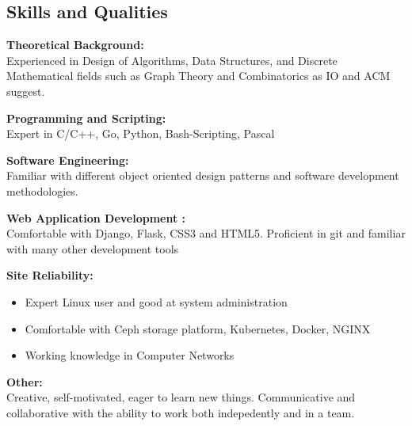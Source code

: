\documentclass[margin]{res}
\begin{document}
\begin{resume}
\section{Skills and Qualities} 
    {\bf Theoretical Background:}
    \\Experienced in Design of Algorithms, Data Structures, and Discrete Mathematical fields such as Graph Theory and Combinatorics as IO and ACM suggest.

	{\bf Programming and Scripting:}
	\\Expert in C/C++, Go, Python, Bash-Scripting, Pascal
	
    {\bf Software Engineering:}
    \\Familiar with different object oriented design patterns and software development methodologies.
	
	{\bf Web Application Development	:}
	\\Comfortable with Django, Flask, CSS3 and HTML5. Proficient in git and familiar with many other development tools
	
	{\bf Site Reliability:}
	\begin{itemize}
		\item Expert Linux user and good at system administration
		\item Comfortable with Ceph storage platform, Kubernetes, Docker, NGINX
		\item Working knowledge in Computer Networks
	\end{itemize}
	
	{\bf Other:}
	\\Creative, self-motivated, eager to learn new things. Communicative and collaborative with the ability to work both indepedently and in a team.
	
	\vspace{3mm}

\end{resume}
\end{document}
